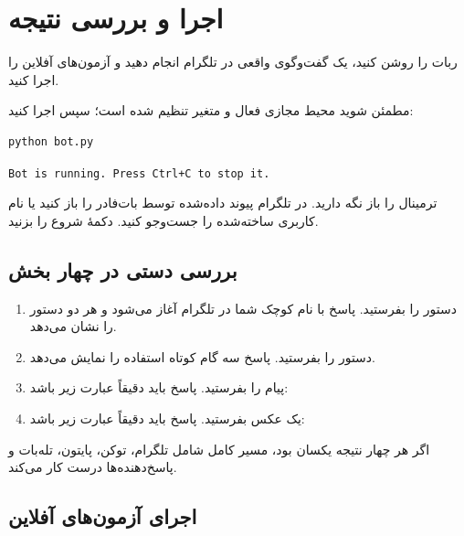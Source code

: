 \chapter{اجرا و بررسی نتیجه}

\begin{goalbox}
ربات را روشن کنید، یک گفت‌وگوی واقعی در تلگرام انجام دهید و آزمون‌های آفلاین را اجرا کنید.
\end{goalbox}

مطمئن شوید محیط مجازی فعال و متغیر
تنظیم شده است؛ سپس اجرا کنید:

\begin{LTR}
\begin{lstlisting}[language=bash,numbers=none]
python bot.py
\end{lstlisting}

\begin{resultbox}
\texttt{Bot is running. Press Ctrl+C to stop it.}
\end{resultbox}
\end{LTR}

ترمینال را باز نگه دارید. در تلگرام پیوند داده‌شده توسط بات‌فادر را باز کنید یا
نام کاربری ساخته‌شده را جست‌وجو کنید. دکمهٔ شروع را بزنید.

\section{بررسی دستی در چهار بخش}

\begin{enumerate}
\item دستور
را بفرستید. پاسخ با نام کوچک شما در تلگرام آغاز می‌شود و هر دو دستور را نشان می‌دهد.
\item دستور
را بفرستید. پاسخ سه گام کوتاه استفاده را نمایش می‌دهد.
\item پیام
را بفرستید. پاسخ باید دقیقاً عبارت زیر باشد:
\item یک عکس بفرستید. پاسخ باید دقیقاً عبارت زیر باشد:
\end{enumerate}

اگر هر چهار نتیجه یکسان بود، مسیر کامل شامل تلگرام، توکن، پایتون، تله‌بات و
پاسخ‌دهنده‌ها درست کار می‌کند.

\section{اجرای آزمون‌های آفلاین}


